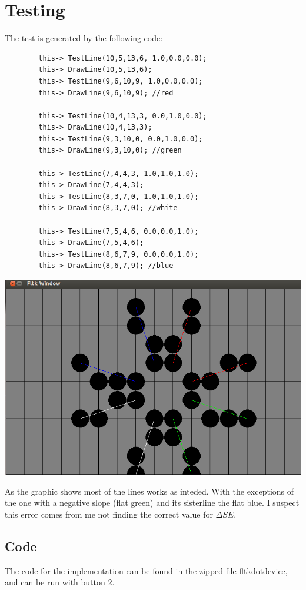 \documentclass{article}
\begin{document}
\section{Testing}
The test is generated by the following code:
\begin{verbatim}
        this-> TestLine(10,5,13,6, 1.0,0.0,0.0);
        this-> DrawLine(10,5,13,6);
        this-> TestLine(9,6,10,9, 1.0,0.0,0.0);
        this-> DrawLine(9,6,10,9); //red

        this-> TestLine(10,4,13,3, 0.0,1.0,0.0);
        this-> DrawLine(10,4,13,3);
        this-> TestLine(9,3,10,0, 0.0,1.0,0.0);
        this-> DrawLine(9,3,10,0); //green

        this-> TestLine(7,4,4,3, 1.0,1.0,1.0);
        this-> DrawLine(7,4,4,3);
        this-> TestLine(8,3,7,0, 1.0,1.0,1.0);
        this-> DrawLine(8,3,7,0); //white

        this-> TestLine(7,5,4,6, 0.0,0.0,1.0);
        this-> DrawLine(7,5,4,6);
        this-> TestLine(8,6,7,9, 0.0,0.0,1.0);
        this-> DrawLine(8,6,7,9); //blue
\end{verbatim}
\begin{center}
    \includegraphics[scale=0.3]{GrafikTest.png}
\end{center}
As the graphic shows most of the lines works as inteded. With the
exceptions of the one with a negative slope (flat green) and its
sisterline the flat blue. I suspect this error comes from me not
finding the correct value for $\Delta SE$.

\subsection{Code}
The code for the implementation can be found in the zipped file
fltkdotdevice, and can be run with button 2.
\end{document}
